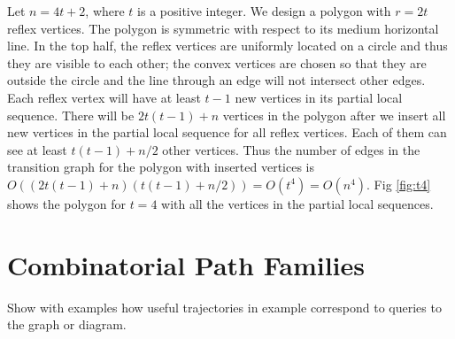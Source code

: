 \documentclass[]{styles/svproc}  %
\begin{document}
Let $n = 4t+2$, where $t$ is a positive integer. We design a polygon with
$r = 2t$ reflex vertices. The polygon is symmetric with respect to its medium
horizontal line. In the top half, the reflex vertices are uniformly located on a
circle and thus they are visible to each other; the convex vertices are chosen
so that they are outside the circle and the line through an edge will not
intersect other edges. Each reflex vertex will have at least $t-1$ new
vertices in its partial local sequence. There will be $2t(t-1)+n$
vertices in the polygon after we insert all new vertices in the partial local
sequence for all reflex vertices. Each of them can see at least $t(t-1)+n/2$
other vertices. Thus the number of edges in the transition graph for the
polygon with inserted vertices is
$O ((2t(t-1)+n)(t(t-1)+n/2)) = O(t^4) = O(n^4)$.
Fig \ref{fig:t4} shows the polygon for $t = 4$ with all the
vertices in the partial local sequences. %


%
%

\section{Combinatorial Path Families}

{\color{red}
Show with examples how useful trajectories in example correspond to queries to
the graph or diagram.}
\end{document}
